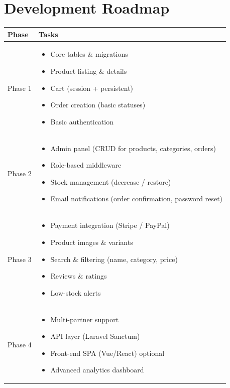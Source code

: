 \documentclass[12pt,a4paper]{article}
\begin{document}
\section{Development Roadmap}
\begin{longtable}{|p{3cm}|p{10cm}|}
\hline
\textbf{Phase} & \textbf{Tasks} \\
\hline

Phase 1 &
\begin{itemize}[leftmargin=*,nosep]
    \item Core tables \& migrations
    \item Product listing \& details
    \item Cart (session + persistent)
    \item Order creation (basic statuses)
    \item Basic authentication
\end{itemize} \\
\hline

Phase 2 &
\begin{itemize}[leftmargin=*,nosep]
    \item Admin panel (CRUD for products, categories, orders)
    \item Role-based middleware
    \item Stock management (decrease / restore)
    \item Email notifications (order confirmation, password reset)
\end{itemize} \\
\hline

Phase 3 &
\begin{itemize}[leftmargin=*,nosep]
    \item Payment integration (Stripe / PayPal)
    \item Product images \& variants
    \item Search \& filtering (name, category, price)
    \item Reviews \& ratings
    \item Low-stock alerts
\end{itemize} \\
\hline

Phase 4 &
\begin{itemize}[leftmargin=*,nosep]
    \item Multi-partner support
    \item API layer (Laravel Sanctum)
    \item Front-end SPA (Vue/React) optional
    \item Advanced analytics dashboard
\end{itemize} \\
\hline

\end{longtable}
\end{document}
